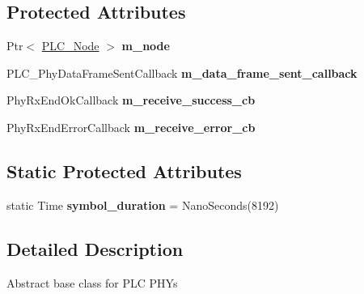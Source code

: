 \subsection*{\-Protected \-Attributes}
\begin{DoxyCompactItemize}
\item 
\hypertarget{classns3_1_1PLC__Phy_a1bc49688d4ac54538439e1a39a595be0}{\-Ptr$<$ \hyperlink{classns3_1_1PLC__Node}{\-P\-L\-C\-\_\-\-Node} $>$ {\bfseries m\-\_\-node}}\label{classns3_1_1PLC__Phy_a1bc49688d4ac54538439e1a39a595be0}

\item 
\hypertarget{classns3_1_1PLC__Phy_afc2005e3f6427922206d8a7255b985df}{\-P\-L\-C\-\_\-\-Phy\-Data\-Frame\-Sent\-Callback {\bfseries m\-\_\-data\-\_\-frame\-\_\-sent\-\_\-callback}}\label{classns3_1_1PLC__Phy_afc2005e3f6427922206d8a7255b985df}

\item 
\hypertarget{classns3_1_1PLC__Phy_a3cb312c1f9c2adb0f5565a3c7fa619a3}{\-Phy\-Rx\-End\-Ok\-Callback {\bfseries m\-\_\-receive\-\_\-success\-\_\-cb}}\label{classns3_1_1PLC__Phy_a3cb312c1f9c2adb0f5565a3c7fa619a3}

\item 
\hypertarget{classns3_1_1PLC__Phy_a199024edfc1cb1242e1b66ec56239d44}{\-Phy\-Rx\-End\-Error\-Callback {\bfseries m\-\_\-receive\-\_\-error\-\_\-cb}}\label{classns3_1_1PLC__Phy_a199024edfc1cb1242e1b66ec56239d44}

\end{DoxyCompactItemize}
\subsection*{\-Static \-Protected \-Attributes}
\begin{DoxyCompactItemize}
\item 
\hypertarget{classns3_1_1PLC__Phy_ac75ba543faa54de93f57144070b4e420}{static \-Time {\bfseries symbol\-\_\-duration} = \-Nano\-Seconds(8192)}\label{classns3_1_1PLC__Phy_ac75ba543faa54de93f57144070b4e420}

\end{DoxyCompactItemize}


\subsection{\-Detailed \-Description}
\-Abstract base class for \-P\-L\-C \-P\-H\-Ys 

